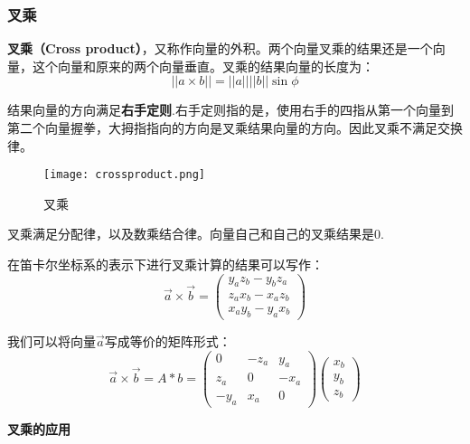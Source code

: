 \documentclass[openany]{progbookcn}
\begin{document}
\subsubsection{叉乘}

\textbf{叉乘（Cross product）}，又称作向量的外积。两个向量叉乘的结果还是一个向量，这个向量和原来的两个向量垂直。叉乘的结果向量的长度为：
\begin{equation}
	||a\times b||=||a||||b||\sin\phi
\end{equation}

结果向量的方向满足\textbf{右手定则}.右手定则指的是，使用右手的四指从第一个向量到第二个向量握拳，大拇指指向的方向是叉乘结果向量的方向。因此叉乘不满足交换律。

\begin{figure}[H]
	\centering
	\texttt{[image: crossproduct.png]}
	\caption{叉乘}
	\label{fig:corssproduct}
\end{figure}

叉乘满足分配律，以及数乘结合律。向量自己和自己的叉乘结果是0.

在笛卡尔坐标系的表示下进行叉乘计算的结果可以写作：
\begin{equation}
	\overrightarrow{a} \times \overrightarrow{b} = \begin{pmatrix}
		y_az_b-y_bz_a\\ 
		z_ax_b-x_az_b\\
		x_ay_b-y_ax_b
	\end{pmatrix}
\end{equation}

我们可以将向量$	\overrightarrow{a}$写成等价的矩阵形式：
\begin{equation}
	\overrightarrow{a} \times \overrightarrow{b} = 
	A*b=\begin{pmatrix}
		0&-z_a&y_a\\
		z_a& 0& -x_a\\
		-y_a & x_a & 0
	\end{pmatrix} 
	\begin{pmatrix}
		x_b\\
		y_b\\
		z_b
	\end{pmatrix} 
\end{equation}

\textbf{叉乘的应用}
\end{document}
